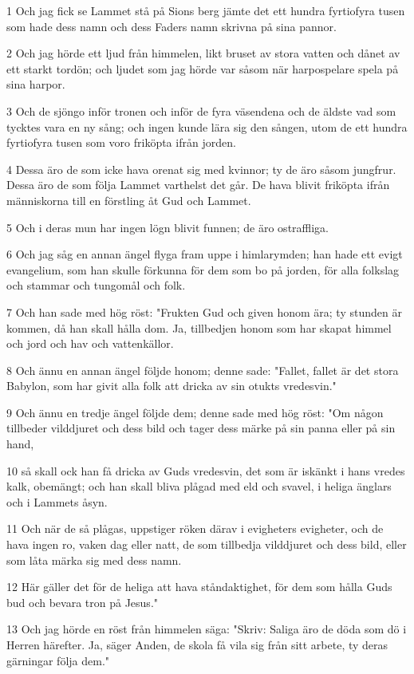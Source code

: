 \par 1 Och jag fick se Lammet stå på Sions berg jämte det ett hundra fyrtiofyra tusen som hade dess namn och dess Faders namn skrivna på sina pannor.
\par 2 Och jag hörde ett ljud från himmelen, likt bruset av stora vatten och dånet av ett starkt tordön; och ljudet som jag hörde var såsom när harpospelare spela på sina harpor.
\par 3 Och de sjöngo inför tronen och inför de fyra väsendena och de äldste vad som tycktes vara en ny sång; och ingen kunde lära sig den sången, utom de ett hundra fyrtiofyra tusen som voro friköpta ifrån jorden.
\par 4 Dessa äro de som icke hava orenat sig med kvinnor; ty de äro såsom jungfrur. Dessa äro de som följa Lammet varthelst det går. De hava blivit friköpta ifrån människorna till en förstling åt Gud och Lammet.
\par 5 Och i deras mun har ingen lögn blivit funnen; de äro ostraffliga.
\par 6 Och jag såg en annan ängel flyga fram uppe i himlarymden; han hade ett evigt evangelium, som han skulle förkunna för dem som bo på jorden, för alla folkslag och stammar och tungomål och folk.
\par 7 Och han sade med hög röst: "Frukten Gud och given honom ära; ty stunden är kommen, då han skall hålla dom. Ja, tillbedjen honom som har skapat himmel och jord och hav och vattenkällor.
\par 8 Och ännu en annan ängel följde honom; denne sade: "Fallet, fallet är det stora Babylon, som har givit alla folk att dricka av sin otukts vredesvin."
\par 9 Och ännu en tredje ängel följde dem; denne sade med hög röst: "Om någon tillbeder vilddjuret och dess bild och tager dess märke på sin panna eller på sin hand,
\par 10 så skall ock han få dricka av Guds vredesvin, det som är iskänkt i hans vredes kalk, obemängt; och han skall bliva plågad med eld och svavel, i heliga änglars och i Lammets åsyn.
\par 11 Och när de så plågas, uppstiger röken därav i evigheters evigheter, och de hava ingen ro, vaken dag eller natt, de som tillbedja vilddjuret och dess bild, eller som låta märka sig med dess namn.
\par 12 Här gäller det för de heliga att hava ståndaktighet, för dem som hålla Guds bud och bevara tron på Jesus."
\par 13 Och jag hörde en röst från himmelen säga: "Skriv: Saliga äro de döda som dö i Herren härefter. Ja, säger Anden, de skola få vila sig från sitt arbete, ty deras gärningar följa dem."
